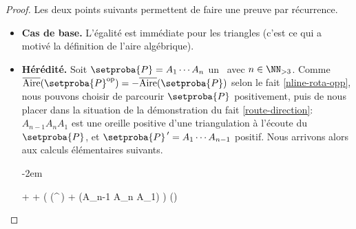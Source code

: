 \begin{proof}
    Les deux points suivants permettent de faire une preuve par récurrence.

    \begin{itemize}
		\item \textbf{Cas de base.}
		L'égalité est immédiate pour les triangles (c'est ce qui a motivé la définition de l'aire algébrique).


		\item \textbf{Hérédité.}
		Soit $\setproba{P} = A_1 \cdots A_n$ un \ngone\ avec $n \in \NN_{>3}$.
		Comme $\sarea{\setproba{P}^{\mathrm{op}}} = - \sarea{\setproba{P}}$ selon le fait \ref{nline-rota-opp}, nous pouvons choisir de parcourir $\setproba{P}$ positivement, puis de nous placer dans la situation de la démonstration du fait \ref{route-direction}:
		$A_{n-1} A_n A_1$ est une oreille positive d'une triangulation à l'écoute du \ngone\ $\setproba{P}$,
		et
		$\setproba{P}^{\,\prime} = A_1 \cdots A_{n-1}$ positif.
		Nous arrivons alors aux calculs élémentaires suivants.
		
		\leavevmode\kern-2em%
		\begin{stepcalc}[style=ar*]
		          {}
		     + 
		          {}
		      +  
		          {}
		     \big( \mu(^{\,\prime}) + \mu(A_{n-1} A_n A_1) \big)
		          {}
		     \mu()
		          {}
		     
		\explnext{}
		\end{stepcalc}
    \end{itemize}
    
    \null\vspace{-3.5ex}
\end{proof}








